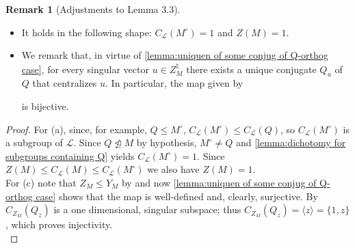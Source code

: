 \documentclass{amsart}
\numberwithin{equation}{section}
\theoremstyle{definition}
\newtheorem{remark}[equation]{Remark}
\theoremstyle{subresult}
\theoremstyle{caseresult}
\renewcommand{\L}{\mathcal{L}}
\newcommand{\norm}{\trianglelefteq}
\newcommand{\<}{\langle}
\renewcommand{\>}{\rangle}
\begin{document}
\begin{remark}[Adjustments to Lemma 3.3]\label{lemma3.3} \leavevmode \\[-15pt]
	\begin{itemize}
		\item[(a)] It holds in the following shape: $C_\L(M^\circ)=1$ and $Z(M) = 1$.
		\item[(c)] We remark that, in virtue of \ref{lemma:uniquen of some conjug of Q-orthog case}, for every singular vector $u \in Z_M^\natural$ there exists a unique conjugate $Q_{u}$ of $Q$ that centralizes $u$. In particular, the map given by
		\begin{center}
		\end{center}
	is bijective.
	\end{itemize}
\begin{proof}
	For (a), since, for example, $Q \le M^\circ$, $C_\L(M^\circ) \le C_\L(Q)$, so $C_\L(M^\circ)$ is a subgroup of $\L$. Since $Q \not \norm M$ by hypothesis, $M^\circ \ne Q$ and \ref{lemma:dichotomy for subgroups containing Q} yields $C_{\L}(M^\circ) = 1$. Since $Z(M) \le C_\L(M) \le C_\L(M^\circ)$ we also have $Z(M)=1$.\\
	
	For (c) note that $Z_M \le Y_M$ by \cite[Lemma 3.3(b)]{Meier-Stell-Stroth:2012} and now \ref{lemma:uniquen of some conjug of Q-orthog case} shows that the map is well-defined and, clearly, surjective. By \cite[Lemma 3.3(c)]{Meier-Stellm-Stroth:2003} $C_{Z_M}(Q_z)$ is a one dimensional, singular subspace; thus $C_{Z_M}(Q_z) =\<z\> = \{1,z\}$, which proves injectivity.\\


\end{proof}
\end{remark}
\end{document}
